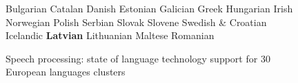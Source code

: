 \begin{figure}[t]
\begin{tabular}
Bulgarian \newline 
 Catalan \newline 
 Danish \newline 
 Estonian \newline 
 Galician \newline 
Greek \newline 
 Hungarian \newline 
 Irish \newline 
 Norwegian \newline 
Polish \newline 
 Serbian \newline 
 Slovak \newline 
Slovene \newline 
 Swedish
 & \vspace*{0.5mm}Croatian \newline 
 Icelandic \newline 
\textbf{Latvian} \newline 
 Lithuanian \newline 
 Maltese  \newline 
Romanian
\end{tabular}
\caption{Speech processing: state of language technology support for 30 European languages clusters}
 \label{fig:mt_cluster_en}
\end{figure}
